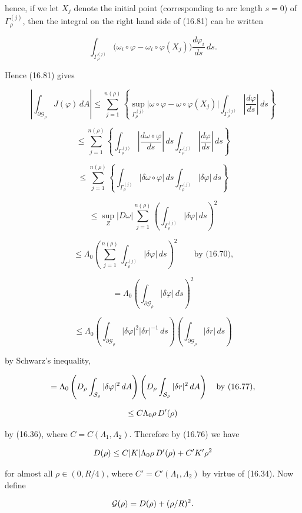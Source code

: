 hence, if we let $X_j$ denote the initial point (corresponding to arc length $s=0$) of $\Gamma_\rho^{(j)}$, then the integral on the right hand side of (16.81) can be written

\[
\int_{\Gamma_\rho^{(j)}} \bigl(\omega_i\circ\varphi-\omega_i\circ\varphi(X_j)\bigr)\frac{d\varphi_i}{ds}\, ds.
\]

Hence (16.81) gives

\[
\left|\int_{\partial\mathcal G_\rho} J(\varphi)\, dA\right|
\leq \sum_{j=1}^{n(\rho)}
\left\{
\sup_{\Gamma_\rho^{(j)}}\bigl|\omega\circ\varphi-\omega\circ\varphi(X_j)\bigr|
\int_{\Gamma_\rho^{(j)}} \left|\frac{d\varphi}{ds}\right|\, ds
\right\}
\]

\[
\leq \sum_{j=1}^{n(\rho)}
\left\{
\int_{\Gamma_\rho^{(j)}} \left|\frac{d\omega\circ\varphi}{ds}\right|\, ds
\int_{\Gamma_\rho^{(j)}} \left|\frac{d\varphi}{ds}\right|\, ds
\right\}
\]

\[
\leq \sum_{j=1}^{n(\rho)}
\left\{
\int_{\Gamma_\rho^{(j)}} |\delta\omega\circ\varphi|\, ds
\int_{\Gamma_\rho^{(j)}} |\delta\varphi|\, ds
\right\}
\]

\[
\leq \sup_Z |D\omega|
\sum_{j=1}^{n(\rho)} \left(\int_{\Gamma_\rho^{(j)}} |\delta\varphi|\, ds\right)^2
\]

\[
\leq \Lambda_0 \left(\sum_{j=1}^{n(\rho)} \int_{\Gamma_\rho^{(j)}} |\delta\varphi|\, ds\right)^2
\qquad \text{by (16.70),}
\]

\[
= \Lambda_0 \left(\int_{\partial\mathcal G_\rho} |\delta\varphi|\, ds\right)^2
\]

\[
\leq \Lambda_0 \left(\int_{\partial\mathcal G_\rho} |\delta\varphi|^2|\delta r|^{-1}\, ds\right)
\left(\int_{\partial\mathcal G_\rho} |\delta r|\, ds\right)
\]

by Schwarz's inequality,



\[
= \Lambda_0\left(D_\rho \int_{\mathcal{S}_\rho} |\delta\varphi|^2\,dA\right)\left(D_\rho \int_{\mathcal{S}_\rho} |\delta r|^2\,dA\right)\quad \text{by (16.77),}
\]

\[
\leq C\Lambda_0\rho\,D'(\rho)
\]

by (16.36), where $C=C(\Lambda_1,\Lambda_2)$. Therefore by (16.76) we have

\[
D(\rho)\leq C|K|\Lambda_0\rho\,D'(\rho)+C'K'\rho^2
\]

for almost all $\rho\in(0,R/4)$, where $C'=C'(\Lambda_1,\Lambda_2)$ by virtue of (16.34). Now define

\[
\mathcal{G}(\rho)=D(\rho)+(\rho/R)^2.
\]

